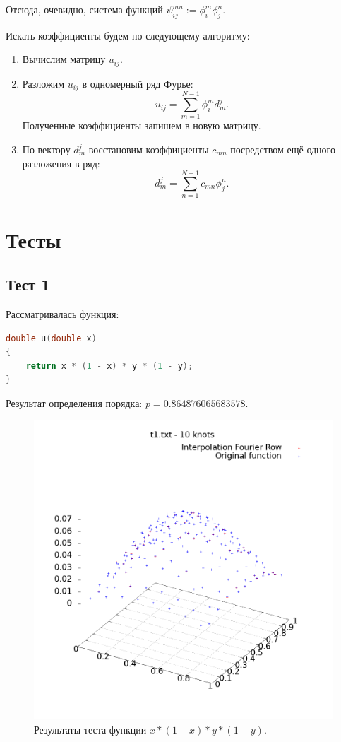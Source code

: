 \documentclass[14pt,a4paper]{extarticle}
\newcommand{\1}{\mathbbm{1}}
\begin{document}
Отсюда, очевидно, система функций $\psi_{ij}^{mn} := \phi_i^m \phi_j^n $. \par
Искать коэффициенты будем по следующему алгоритму:
\begin{enumerate}
    \item Вычислим матрицу $u_{ij}$.
    \item Разложим $u_{ij}$ в одномерный ряд Фурье:
          \begin{equation*}
              u_{ij} = \sum _{m = 1}^{N - 1} \phi_i^m d_m^j.
          \end{equation*}
          Полученные коэффициенты запишем в новую матрицу.
    \item По вектору $d_m^j$ восстановим коэффициенты $c_{mn}$ посредством ещё одного разложения в ряд:
          \begin{equation*}
              d_m^j = \sum _{n = 1}^{N - 1} c_{mn} \phi_j^n.
          \end{equation*}
\end{enumerate}


\section{Тесты}
\subsection{Тест 1}
Рассматривалась функция:
\begin{lstlisting}[language=c]
    double u(double x)
{
    return x * (1 - x) * y * (1 - y);
}
    \end{lstlisting}

Результат определения порядка: $p = 0.864876065683578$.

\begin{figure}
    \centering
    \includegraphics[scale=0.5]{Images/t1.txt.png}
    \caption{Результаты теста функции $x * (1 - x) * y * (1 - y)$.}
\end{figure}
\end{document}
